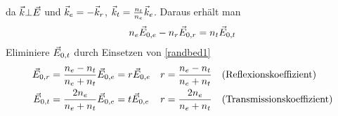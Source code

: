 da $\vec{k}\bot\vec{E}$ und $\vec{k}_e = -\vec{k}_r$, 
$\vec{k}_t = \frac{n_t}{n_e}\vec{k}_e$. Daraus erhält man
\begin{gather*}
  n_e\vec{E}_{0,e} -   n_r\vec{E}_{0,r} =   n_t\vec{E}_{0,t}
\end{gather*}
Eliminiere $\vec{E}_{0,t}$ durch Einsetzen von \eqref{randbed1}
\begin{align*}
  \vec{E}_{0,r} &= \frac{n_e-n_t}{n_e+n_t} \vec{E}_{0,e} = r\vec{E}_{0,e}
  &r &= \frac{n_e-n_t}{n_e+n_t} 
  &&\text{(Reflexionskoeffizient)}\\
  \vec{E}_{0,t} &= \frac{2n_e}{n_e+n_t} \vec{E}_{0,e} = t\vec{E}_{0,e}
  &r &= \frac{2n_e}{n_e+n_t} 
  &&\text{(Transmissionskoeffizient)}
\end{align*}%
%
%
%
%





